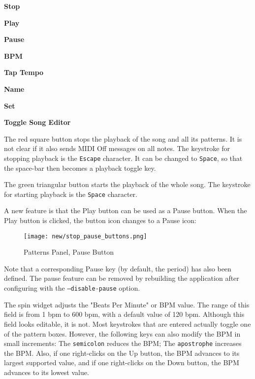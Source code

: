    \begin{enumber}
      \item \textbf{Stop}
      \item \textbf{Play}
      \item \textbf{Pause}
      \item \textbf{BPM}
      \item \textbf{Tap Tempo}
      \item \textbf{Name}
      \item \textbf{Set}
      \item \textbf{Toggle Song Editor}
   \end{enumber}

   \setcounter{ItemCounter}{0}      %

   The red square button stops the playback of the song and all its patterns.
   It is not clear if it also sends MIDI Off messages on all notes.
   The keystroke for stopping playback is the \texttt{Escape} character.
   It can be changed to \texttt{Space}, so that the space-bar then becomes a
   playback toggle key.

   The green triangular button starts the playback of the whole song.
   The keystroke for starting playback is the \texttt{Space} character.

   A new feature is that the Play button can be used as a Pause button.
   When the Play button is clicked, the button icon changes to a Pause icon:

\begin{figure}[H]
   \centering 
   \texttt{[image: new/stop\_pause\_buttons.png]}
   \caption{Patterns Panel, Pause Button}
   \label{fig:pattern_window_pause_button}
\end{figure}

   Note that a corresponding Pause key (by default, the period) has also been
   defined.  The pause feature can be removed by rebuilding the application
   after configuring with the \texttt{--disable-pause} option.

   The spin widget adjusts the "Beats Per Minute" or BPM value.  The
   range of this field is from 1 bpm to 600 bpm, with a default value of
   120 bpm.
   Although this field looks editable, it is not.  Most keystrokes
   that are entered actually toggle one of the pattern boxes.
   However, the following keys can also modify the BPM in small increments:
    The \texttt{semicolon} reduces the BPM;
    The \texttt{apostrophe} increases the BPM.
   Also, if one right-clicks on the Up button, the BPM advances to its largest
   supported value, and if one right-clicks on the Down button, the BPM
   advances to its lowest value.

